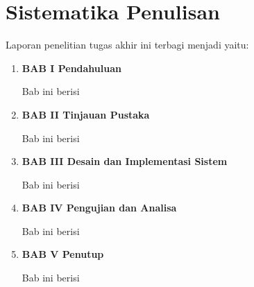 \section{Sistematika Penulisan}
\label{sec:sistematikapenulisan}

Laporan penelitian tugas akhir ini terbagi menjadi \lipsum[1][1-3] yaitu:

\begin{enumerate}[nolistsep]

  \item \textbf{BAB I Pendahuluan}

  Bab ini berisi \lipsum[2][1-5]

  \vspace{2ex}

  \item \textbf{BAB II Tinjauan Pustaka}

  Bab ini berisi \lipsum[3][1-5]

  \vspace{2ex}

  \item \textbf{BAB III Desain dan Implementasi Sistem}

  Bab ini berisi \lipsum[4][1-5]

  \vspace{2ex}

  \item \textbf{BAB IV Pengujian dan Analisa}

  Bab ini berisi \lipsum[5][1-5]

  \vspace{2ex}

  \item \textbf{BAB V Penutup}

  Bab ini berisi \lipsum[6][1-5]

\end{enumerate}
